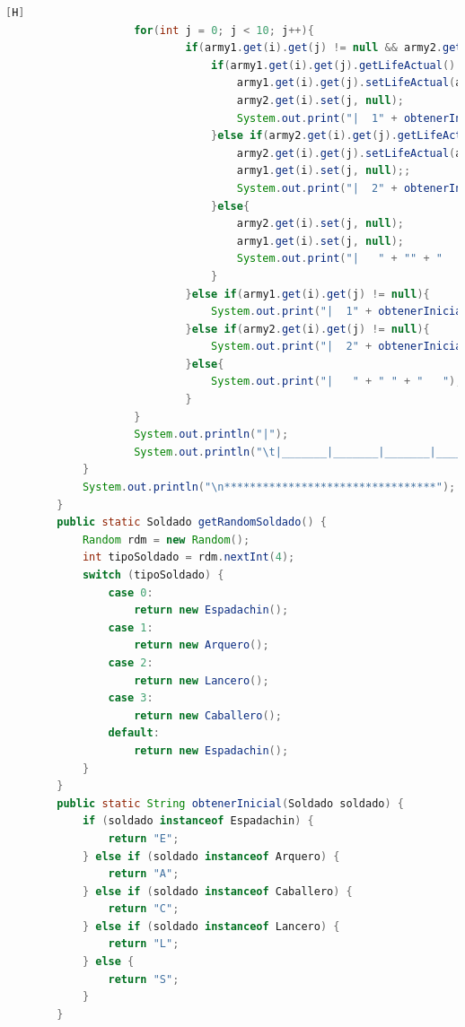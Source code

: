 \documentclass{article}
\begin{document}
\begin{lstlisting}[language=java,caption={Las lineas de codigos de la clase Mapa creada:}][H]
					for(int j = 0; j < 10; j++){
							if(army1.get(i).get(j) != null && army2.get(i).get(j) != null){ //CREAMOS UN IF PARA QUE ESTE NOS AYUDE A SABER QUIEN DE ESTOS SOLDADOS SE OCUPARA DEL CASILLERO EL CUAL DONDE ESTAN PELEANDO
								if(army1.get(i).get(j).getLifeActual() > army2.get(i).get(j).getLifeActual()){
									army1.get(i).get(j).setLifeActual(army1.get(i).get(j).getLifeActual() - army2.get(i).get(j).getLifeActual()); //Cambiamos 
									army2.get(i).set(j, null); 
									System.out.print("|  1" + obtenerInicial(army1.get(i).get(j)) + "1  ");
								}else if(army2.get(i).get(j).getLifeActual() > army1.get(i).get(j).getLifeActual()){
									army2.get(i).get(j).setLifeActual(army2.get(i).get(j).getLifeActual() - army1.get(i).get(j).getLifeActual());
									army1.get(i).set(j, null);;
									System.out.print("|  2" + obtenerInicial(army2.get(i).get(j)) + "2  ");
								}else{
									army2.get(i).set(j, null);
									army1.get(i).set(j, null);
									System.out.print("|   " + "" + "   ");
								}
							}else if(army1.get(i).get(j) != null){
								System.out.print("|  1" + obtenerInicial(army1.get(i).get(j)) + "1  ");
							}else if(army2.get(i).get(j) != null){
								System.out.print("|  2" + obtenerInicial(army2.get(i).get(j)) + "2  ");
							}else{
								System.out.print("|   " + " " + "   ");
							}
					}
					System.out.println("|");
					System.out.println("\t|_______|_______|_______|_______|_______|_______|_______|_______|_______|_______|");
			}
			System.out.println("\n*********************************");
		}
		public static Soldado getRandomSoldado() {
			Random rdm = new Random();
			int tipoSoldado = rdm.nextInt(4);
			switch (tipoSoldado) {
				case 0:
					return new Espadachin();
				case 1:
					return new Arquero();
				case 2:
					return new Lancero();
				case 3:
					return new Caballero();
				default:
					return new Espadachin();
			}
		}
		public static String obtenerInicial(Soldado soldado) {
			if (soldado instanceof Espadachin) {
				return "E";
			} else if (soldado instanceof Arquero) {
				return "A";
			} else if (soldado instanceof Caballero) {
				return "C";
			} else if (soldado instanceof Lancero) {
				return "L";
			} else {
				return "S";
			}
		}
	\end{lstlisting}
\end{document}
